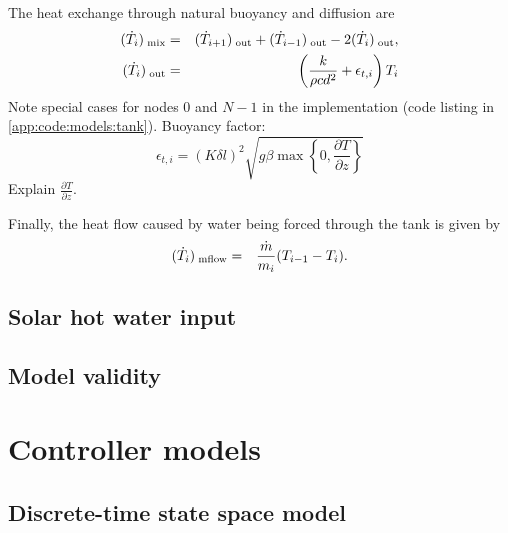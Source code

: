 The heat exchange through natural buoyancy and diffusion are
\begin{eqnarray}
   \label{eq:flow-mix}
   \flow{mix} &=& \flow[i+1]{out} + \flow[i-1]{out} - 2 \flow{out}, \\
   \label{eq:flow-mix-out}
   \flow{out} &=& \left(\frac{k}{\rho c d^2} + \epsilon_{t, i}\right)T_i
\end{eqnarray}
Note special cases for nodes 0 and $N-1$ in the implementation (code listing in \autoref{app:code:models:tank}).
Buoyancy factor:
\begin{equation}
   \label{eq:epsilon}
   \epsilon_{t, i} = (K \delta l)^2 \sqrt{g \beta \max \left\{ 0, \frac{\partial T}{\partial z}\right\}}
\end{equation}
Explain $\frac{\partial T}{\partial z}$.

Finally, the heat flow caused by water being forced through the tank is given by
\begin{eqnarray}
	\label{eq:flow-mflow}
	\flow{mflow} &=& \frac{\dot{m}}{m_i} (T_{i-1} - T_i).
\end{eqnarray}

\subsection{Solar hot water input}

\subsection{Model validity}

\section{Controller models}

\subsection{Discrete-time state space model}

